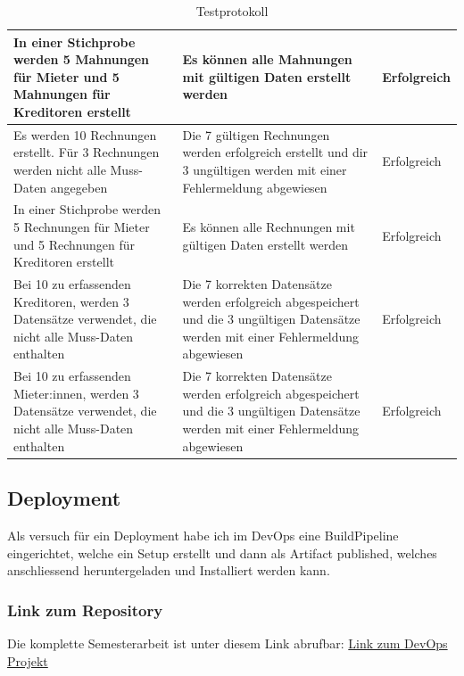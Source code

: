 \begin{table}[H]
\begin{tabulary}{1.0\textwidth}{|L|L|m{2cm}|}
    \hline
    In einer Stichprobe werden 5 Mahnungen für Mieter und 5 Mahnungen für Kreditoren erstellt & Es können alle Mahnungen mit gültigen Daten erstellt werden & Erfolgreich\\
    \hline
    Es werden 10 Rechnungen erstellt. Für 3 Rechnungen werden nicht alle Muss-Daten angegeben & Die 7 gültigen Rechnungen werden erfolgreich erstellt und dir 3 ungültigen werden mit einer Fehlermeldung abgewiesen &  Erfolgreich\\
    \hline   
    In einer Stichprobe werden 5 Rechnungen für Mieter und 5 Rechnungen für Kreditoren erstellt & Es können alle Rechnungen mit gültigen Daten erstellt werden &  Erfolgreich\\
    \hline
    Bei 10 zu erfassenden Kreditoren, werden 3 Datensätze verwendet, die nicht alle Muss-Daten enthalten & Die 7 korrekten Datensätze werden erfolgreich abgespeichert und die 3 ungültigen Datensätze werden mit einer Fehlermeldung abgewiesen &  Erfolgreich\\
    \hline
    Bei 10 zu erfassenden Mieter:innen, werden 3 Datensätze verwendet, die nicht alle Muss-Daten enthalten & Die 7 korrekten Datensätze werden erfolgreich abgespeichert und die 3 ungültigen Datensätze werden mit einer Fehlermeldung abgewiesen &  Erfolgreich\\
    \hline
  \end{tabulary}
  \caption{Testprotokoll}
\end{table}

\subsection{Deployment}
Als versuch für ein Deployment habe ich im DevOps eine BuildPipeline eingerichtet, welche ein Setup erstellt und dann als Artifact published, welches anschliessend heruntergeladen und Installiert werden kann.

\subsubsection{Link zum Repository}
Die komplette Semesterarbeit ist unter diesem Link abrufbar: \href{https://dev.azure.com/michaelneuhaus/Semesterarbeit/}{Link zum DevOps Projekt}